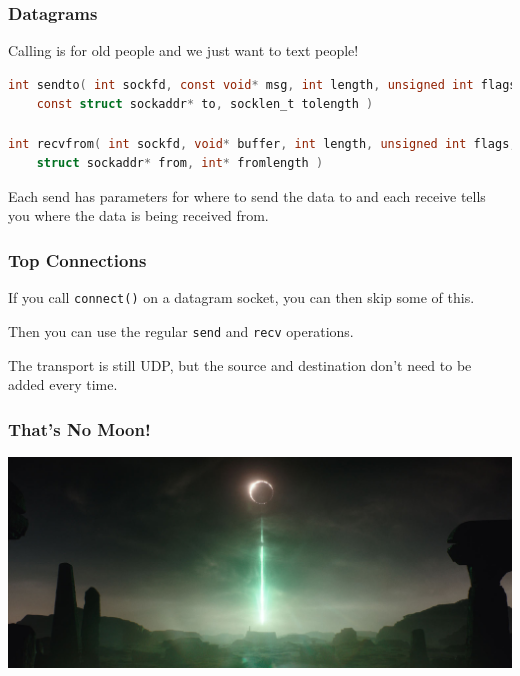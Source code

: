 \begin{frame}[fragile]
\frametitle{Datagrams}

Calling is for old people and we just want to text people! 

\begin{lstlisting}[language=C]
int sendto( int sockfd, const void* msg, int length, unsigned int flags, 
    const struct sockaddr* to, socklen_t tolength )

int recvfrom( int sockfd, void* buffer, int length, unsigned int flags, 
    struct sockaddr* from, int* fromlength )
\end{lstlisting}

Each send has parameters for where to send the data to and each receive tells you where the data is being received from. 

\end{frame}



\begin{frame}
\frametitle{Top Connections}

If you call \texttt{connect()} on a datagram socket, you can then skip some of this.

Then you can use the regular \texttt{send} and \texttt{recv} operations.

The transport is still UDP, but the source and destination don't need to be added every time.

\end{frame}



\begin{frame}
\frametitle{That's No Moon!}

\begin{center}
\includegraphics[width=\textwidth]{images/jedha.jpg}
\end{center}


\end{frame}



